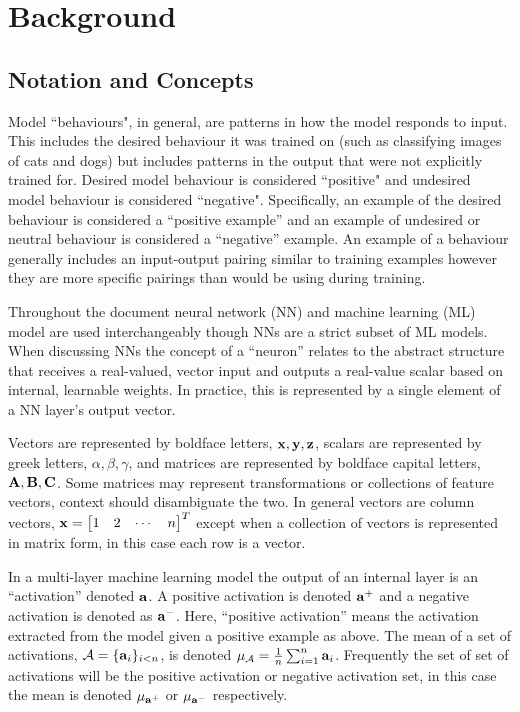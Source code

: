 \chapter{Background}

\section{Notation and Concepts}

Model ``behaviours", in general, are patterns in how the model responds to input.
This includes the desired behaviour it was trained on (such as classifying images of cats and dogs) but includes patterns in the output that were not explicitly trained for.
Desired model behaviour is considered ``positive" and undesired model behaviour is considered ``negative".
Specifically, an example of the desired behaviour is considered a ``positive example'' and an example of undesired or neutral behaviour is considered a ``negative'' example.
An example of a behaviour generally includes an input-output pairing similar to training examples however they are more specific pairings than would be using during training.

Throughout the document neural network (NN) and machine learning (ML) model are used interchangeably though NNs are a strict subset of ML models.
When discussing NNs the concept of a ``neuron'' relates to the abstract structure that receives a real-valued, vector input and outputs a real-value scalar based on internal, learnable weights.
In practice, this is represented by a single element of a NN layer's output vector.

Vectors are represented by boldface letters, $\mathbf{x}, \mathbf{y}, \mathbf{z}$, scalars are represented by greek letters, $\alpha, \beta, \gamma$, and matrices are represented by boldface capital letters, $\mathbf{A}, \mathbf{B}, \mathbf{C}$.
Some matrices may represent transformations or collections of feature vectors, context should disambiguate the two.
In general vectors are column vectors, $\vx = \begin{bmatrix*}
    1 & 2 & \cdots & n
\end{bmatrix*}^T$ except when a collection of vectors is represented in matrix form, in this case each row is a vector.

In a multi-layer machine learning model the output of an internal layer is an ``activation'' denoted $\mathbf{a}$.
A positive activation is denoted $\mathbf{a}^+$ and a negative activation is denoted as $\mathbf{a}^-$. Here, ``positive activation'' means the activation extracted from the model given a positive example as above.
The mean of a set of activations, $\mathcal{A} = \{\mathbf{a}_i\}_{i < n}$, is denoted $\mu_\mathcal{A} = \frac{1}{n}\sum_{i=1}^{n}\mathbf{a}_i$.
Frequently the set of set of activations will be the positive activation or negative activation set, in this case the mean is denoted $\mu_{\mathbf{a}^+}$ or $\mu_{\mathbf{a}^-}$ respectively.

